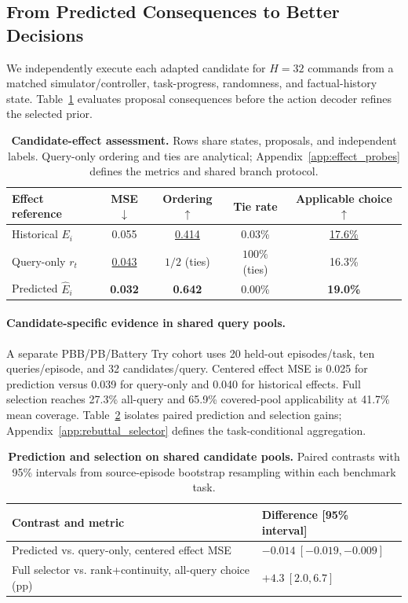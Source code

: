 \subsection{From Predicted Consequences to Better Decisions}
\label{sec:candidate_results}
We independently execute each adapted candidate for $H=32$ commands from a matched simulator/controller, task-progress, randomness, and factual-history state. Table~\ref{tab:effect_probes} evaluates proposal consequences before the action decoder refines the selected prior.

\begin{table}[!ht]
\centering\small
\caption{\textbf{Candidate-effect assessment.} Rows share states, proposals, and independent labels. Query-only ordering and ties are analytical; Appendix~\ref{app:effect_probes} defines the metrics and shared branch protocol.}
\label{tab:effect_probes}
\begin{tabularx}{\linewidth}{@{}Xcccc@{}}
\toprule
Effect reference & MSE $\downarrow$ & Ordering $\uparrow$ & Tie rate & Applicable choice $\uparrow$ \\
\midrule
Historical $E_i$ & 0.055 & \underline{0.414} & {0.03\%} & {\underline{17.6\%}} \\
Query-only $r_t$ & {\underline{0.043}} & $1/2$ (ties) & $100\%$ (ties) & {16.3\%} \\
Predicted $\widehat E_i$ & {\textbf{0.032}} & {\textbf{0.642}} & {0.00\%} & {\textbf{19.0\%}} \\
\bottomrule
\end{tabularx}
\end{table}
\paragraph{Candidate-specific evidence in shared query pools.}
A separate PBB/PB/Battery Try cohort uses 20 held-out episodes/task, ten queries/episode, and 32 candidates/query. Centered effect MSE is 0.025 for prediction versus 0.039 for query-only and 0.040 for historical effects. Full selection reaches 27.3\% all-query and 65.9\% covered-pool applicability at 41.7\% mean coverage. Table~\ref{tab:mechanism_summary} isolates paired prediction and selection gains; Appendix~\ref{app:rebuttal_selector} defines the task-conditional aggregation.

\begin{table}[!ht]
\centering\small
\caption{\textbf{Prediction and selection on shared candidate pools.} Paired contrasts with 95\% intervals from source-episode bootstrap resampling within each benchmark task.}
\label{tab:mechanism_summary}
\begin{tabularx}{\linewidth}{@{}Xl@{}}
\toprule
Contrast and metric & Difference [95\% interval] \\
\midrule
Predicted vs. query-only, centered effect MSE & $-0.014\ [-0.019,-0.009]$ \\
Full selector vs. rank+continuity, all-query choice (pp) & $+4.3\ [2.0,6.7]$ \\
\bottomrule
\end{tabularx}
\end{table}
\label{sec:interpretation}

